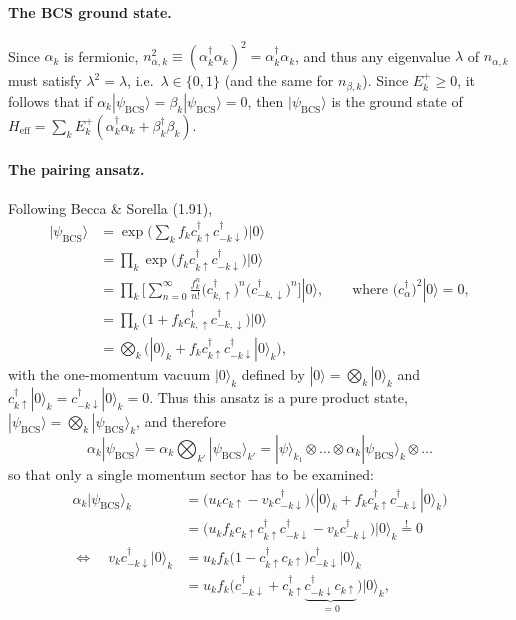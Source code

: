\documentclass[../../main.tex]{subfiles}
\begin{document}
\paragraph{The BCS ground state.}
Since $\alpha_k$ is fermionic,
$n^2_{\alpha,k}\equiv(\alpha^\dagger_k\alpha_k)^2=\alpha^\dagger_k\alpha_k$, and thus any
eigenvalue $\lambda$ of $n_{\alpha,k}$ must satisfy $\lambda^2=\lambda$, i.e.\
$\lambda\in\{0,1\}$ (and the same for $n_{\beta,k}$). Since $E_k^+\ge0$, it follows that
if $\alpha_k|\psi_{\mathrm{BCS}}\rangle=\beta_k|\psi_{\mathrm{BCS}}\rangle=0$, then
$|\psi_{\mathrm{BCS}}\rangle$ is the ground state of
$H_{\mathrm{eff}}=\sum_k E_k^+(\alpha^\dagger_k\alpha_k+\beta^\dagger_k\beta_k)$.

\paragraph{The pairing ansatz.}
Following Becca \& Sorella (1.91),
\begin{align}
|\psi_{\mathrm{BCS}}\rangle
&=\exp\Big(\sum_k f_k c^\dagger_{k\uparrow}c^\dagger_{-k\downarrow}\Big)|0\rangle\\
&=\prod_k\exp\big(f_k c^\dagger_{k\uparrow}c^\dagger_{-k\downarrow}\big)|0\rangle\\
&=\prod_k\Big[\sum_{n=0}^\infty\frac{f_k^n}{n!}
 \big(c^\dagger_{k,\uparrow}\big)^n\big(c^\dagger_{-k,\downarrow}\big)^n\Big]|0\rangle,
 \qquad\text{where }\big(c^\dagger_\alpha\big)^2|0\rangle=0,\\
&=\prod_k\big(1+f_k c^\dagger_{k,\uparrow}c^\dagger_{-k,\downarrow}\big)|0\rangle\\
&=\bigotimes_k\Big(|0\rangle_k
 +f_k c^\dagger_{k\uparrow}c^\dagger_{-k\downarrow}|0\rangle_k\Big),
\end{align}
with the one-momentum vacuum $|0\rangle_k$ defined by $|0\rangle=\bigotimes_k|0\rangle_k$
and $c^\dagger_{k\uparrow}|0\rangle_k=c^\dagger_{-k\downarrow}|0\rangle_k=0$. Thus this
ansatz is a pure product state, $|\psi_{\mathrm{BCS}}\rangle
=\bigotimes_k|\psi_{\mathrm{BCS}}\rangle_k$, and therefore
\begin{equation}
\alpha_k|\psi_{\mathrm{BCS}}\rangle
=\alpha_k\bigotimes_{k'}|\psi_{\mathrm{BCS}}\rangle_{k'}
=|\psi\rangle_{k_1}\otimes\dots\otimes
 \alpha_k|\psi_{\mathrm{BCS}}\rangle_k\otimes\dots
\end{equation}
so that only a single momentum sector has to be examined:
\begin{align}
\alpha_k|\psi_{\mathrm{BCS}}\rangle_k
&=\big(u_k c_{k\uparrow}-v_k c^\dagger_{-k\downarrow}\big)
 \Big(|0\rangle_k+f_k c^\dagger_{k\uparrow}c^\dagger_{-k\downarrow}|0\rangle_k\Big)\\
&=\big(u_kf_k c_{k\uparrow}c^\dagger_{k\uparrow}c^\dagger_{-k\downarrow}
 -v_k c^\dagger_{-k\downarrow}\big)|0\rangle_k\overset{!}{=}0\\
\Longleftrightarrow\quad
v_k c^\dagger_{-k\downarrow}|0\rangle_k
&=u_kf_k\big(1-c^\dagger_{k\uparrow}c_{k\uparrow}\big)
 c^\dagger_{-k\downarrow}|0\rangle_k\\
&=u_kf_k\Big(c^\dagger_{-k\downarrow}
 +c^\dagger_{k\uparrow}\underbrace{c^\dagger_{-k\downarrow}c_{k\uparrow}}_{=0}\Big)
 |0\rangle_k ,
\end{align}
\end{document}
